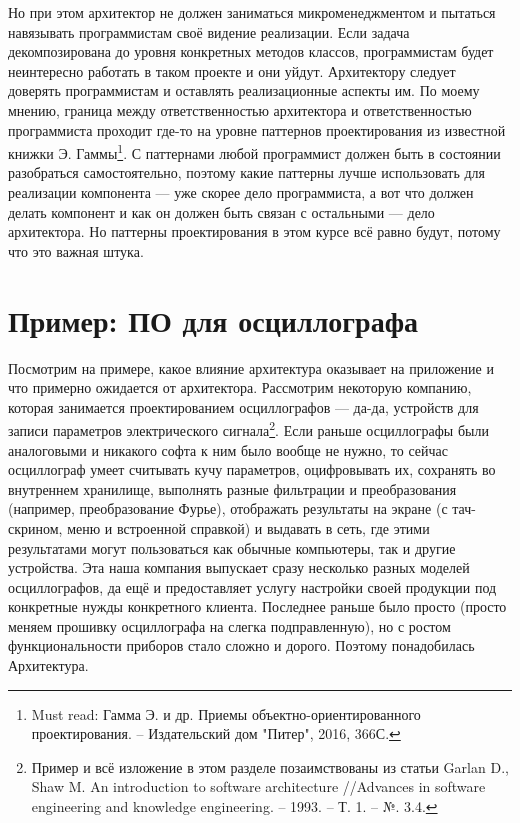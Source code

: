 \documentclass{../../text-style}
\begin{document}
Но при этом архитектор не должен заниматься микроменеджментом и пытаться навязывать программистам своё видение реализации. Если задача декомпозирована до уровня конкретных методов классов, программистам будет неинтересно работать в таком проекте и они уйдут. Архитектору следует доверять программистам и оставлять реализационные аспекты им. По моему мнению, граница между ответственностью архитектора и ответственностью программиста проходит где-то на уровне паттернов проектирования из известной книжки Э. Гаммы\footnote{Must read: Гамма Э. и др. Приемы объектно-ориентированного проектирования. -- Издательский дом "Питер", 2016, 366С.}. С паттернами любой программист должен быть в состоянии разобраться самостоятельно, поэтому какие паттерны лучше использовать для реализации компонента --- уже скорее дело программиста, а вот что должен делать компонент и как он должен быть связан с остальными --- дело архитектора. Но паттерны проектирования в этом курсе всё равно будут, потому что это важная штука.

\section{Пример: ПО для осциллографа}

Посмотрим на примере, какое влияние архитектура оказывает на приложение и что примерно ожидается от архитектора. Рассмотрим некоторую компанию, которая занимается проектированием осциллографов --- да-да, устройств для записи параметров электрического сигнала\footnote{Пример и всё изложение в этом разделе позаимствованы из статьи Garlan D., Shaw M. An introduction to software architecture //Advances in software engineering and knowledge engineering. -- 1993. -- Т. 1. -- №. 3.4.}. Если раньше осциллографы были аналоговыми и никакого софта к ним было вообще не нужно, то сейчас осциллограф умеет считывать кучу параметров, оцифровывать их, сохранять во внутреннем хранилище, выполнять разные фильтрации и преобразования (например, преобразование Фурье), отображать результаты на экране (с тач-скрином, меню и встроенной справкой) и выдавать в сеть, где этими результатами могут пользоваться как обычные компьютеры, так и другие устройства. Эта наша компания выпускает сразу несколько разных моделей осциллографов, да ещё и предоставляет услугу настройки своей продукции под конкретные нужды конкретного клиента. Последнее раньше было просто (просто меняем прошивку осциллографа на слегка подправленную), но с ростом функциональности приборов стало сложно и дорого. Поэтому понадобилась Архитектура.
\end{document}
